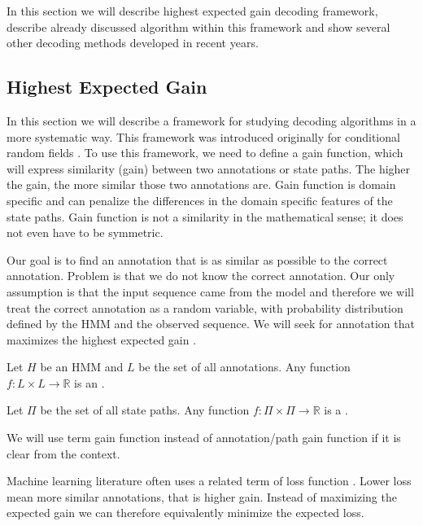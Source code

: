 In this section we will describe highest expected gain decoding framework,
describe already discussed algorithm within this framework and show several
other decoding methods developed in recent years.

\subsection{Highest Expected Gain}

\label{SECTION:HEG}

In this section we will describe a framework for studying decoding algorithms in
a more systematic way. This framework was introduced  originally for
conditional random fields \cite{Gross2007}.  To use this framework, we need to
define a gain function, which will express similarity (gain) between two
annotations or state paths. The higher the gain, the more similar those two
annotations are. Gain function is domain specific and can penalize the differences
in the domain specific features of the state paths.  Gain function is not a
similarity in the mathematical sense; it does not even have to be symmetric.

Our goal is to find an annotation that is as similar as possible to the correct
annotation. Problem is that we do not know the correct annotation. Our only
assumption is that the input sequence came from the model and therefore we will
treat the correct annotation as a random variable, with probability distribution
defined by the HMM and the observed sequence. We will seek for annotation that
maximizes the highest expected gain \cite{Nanasi2010,Nanasi2010mgr}.

\begin{definition}
Let $H$ be an HMM and $L$ be the set of all annotations. Any function
$f:L\times L\to \mathbb{R}$ is an .

Let $\Pi$ be the set of all state paths. Any function $f:\Pi\times
\Pi\to\mathbb{R}$ is a .

\end{definition}

\begin{note}
We will use term gain function instead of annotation/path gain function if it is
clear from the context.

Machine learning literature often uses a related term of loss function
\cite{Lember2010}. Lower loss mean more similar annotations, that is higher gain. Instead
of maximizing the expected gain we can therefore equivalently minimize the expected
loss.
\end{note}

